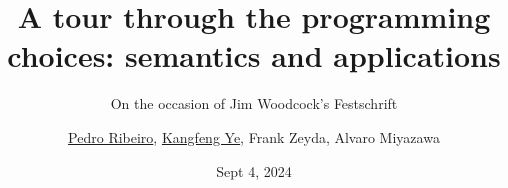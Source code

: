 \documentclass[%
    slidestop,%
    compress,%
    mathserif,%
    table,%
    usenames,%
    aspectratio=169,
    dvipsnames,%
]{beamer}%
\begin{document}

\title[Programming choices]{{\Large A tour through the programming choices: semantics and applications}}
\subtitle{\large On the occasion of Jim Woodcock's Festschrift}


\author[\underline{Pedro Ribeiro} et al.]
{\normalsize \underline{Pedro Ribeiro}, \underline{Kangfeng Ye}, Frank Zeyda, Alvaro Miyazawa}


\date{\small Sept 4, 2024}


%

\end{document}
